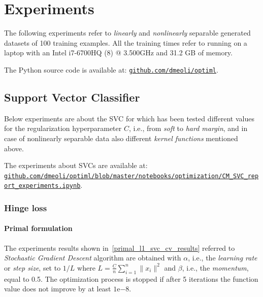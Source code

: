 \section{Experiments}

The following experiments refer to \emph{linearly} and \emph{nonlinearly} separable generated datasets of 100 training examples. All the training times refer to running on a laptop with an Intel i7-6700HQ (8) @ 3.500GHz and 31.2 GB of memory.

The Python source code is available at: \href{https://github.com/dmeoli/optiml}{\texttt{github.com/dmeoli/optiml}}.

\subsection{Support Vector Classifier}

Below experiments are about the SVC for which has been tested different values for the regularization hyperparameter $C$, i.e., from \emph{soft} to \emph{hard margin}, and in case of nonlinearly separable data also different \emph{kernel functions} mentioned above.

The experiments about SVCs are available at: \\ \href{https://github.com/dmeoli/optiml/blob/master/notebooks/optimization/CM_SVC_report_experiments.ipynb}{\texttt{github.com/dmeoli/optiml/blob/master/notebooks/optimization/CM\_SVC\_report\_experiments.ipynb}}.

\subsubsection{Hinge loss}

\paragraph{Primal formulation}


The experiments results shown in~\ref{primal_l1_svc_cv_results} referred to \emph{Stochastic Gradient Descent} algorithm are obtained with $\alpha$, i.e., the \emph{learning rate} or \emph{step size}, set to $1/L$ where $\displaystyle L = \frac{C}{n} \sum_{i=1}^n \| x_i \|^2$ and $\beta$, i.e., the \emph{momentum}, equal to 0.5. The optimization process is stopped if after 5 iterations the function value does not improve by at least $1\mathrm{e}{-8}$.

